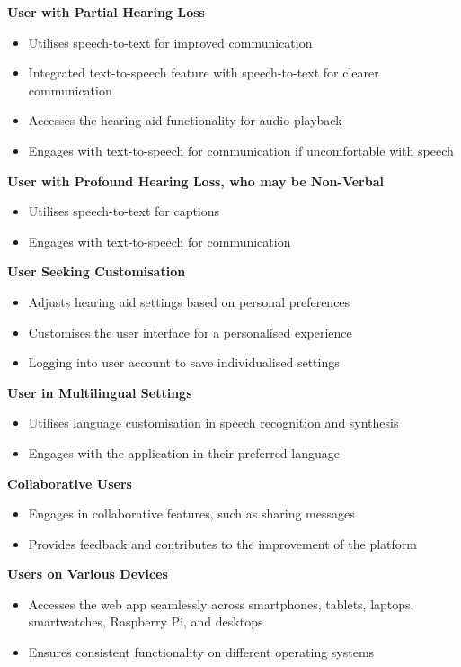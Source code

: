 \documentclass{l4proj}
\begin{document}
\textbf{User with Partial Hearing Loss}
\begin{itemize}
    \item Utilises speech-to-text for improved communication
    \item Integrated text-to-speech feature with speech-to-text for clearer communication
    \item Accesses the hearing aid functionality for audio playback
    \item Engages with text-to-speech for communication if uncomfortable with speech
\end{itemize}

\textbf{User with Profound Hearing Loss, who may be Non-Verbal}
\begin{itemize}
    \item Utilises speech-to-text for captions
    \item Engages with text-to-speech for communication
\end{itemize}

\textbf{User Seeking Customisation}
\begin{itemize}
    \item Adjusts hearing aid settings based on personal preferences
    \item Customises the user interface for a personalised experience
    \item Logging into user account to save individualised settings
\end{itemize}

\textbf{User in Multilingual Settings}
\begin{itemize}
    \item Utilises language customisation in speech recognition and synthesis
    \item Engages with the application in their preferred language
\end{itemize}

\textbf{Collaborative Users}
\begin{itemize}
    \item Engages in collaborative features, such as sharing messages
    \item Provides feedback and contributes to the improvement of the platform
\end{itemize}

\textbf{Users on Various Devices}
\begin{itemize}
    \item Accesses the web app seamlessly across smartphones, tablets, laptops, smartwatches, Raspberry Pi, and desktops
    \item Ensures consistent functionality on different operating systems
\end{itemize}
\end{document}
